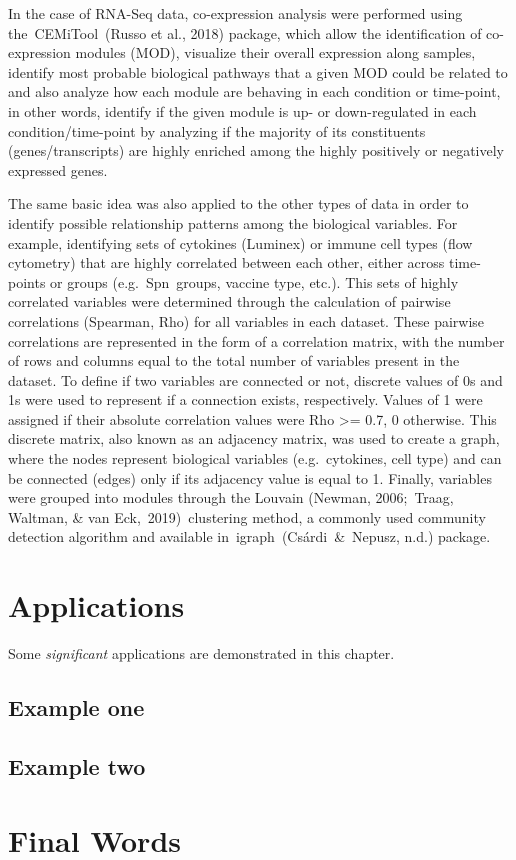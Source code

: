 \documentclass[
]{book}
\begin{document}
In the case of RNA-Seq data, co-expression analysis were performed using the~CEMiTool~(Russo et al., 2018)⁠ package, which allow the identification of co-expression modules (MOD), visualize their overall expression along samples, identify most probable biological pathways that a given MOD could be related to and also analyze how each module are behaving in each condition or time-point, in other words, identify if the given module is up- or down-regulated in each condition/time-point by analyzing if the majority of its constituents (genes/transcripts) are highly enriched among the highly positively or negatively expressed genes.

The same basic idea was also applied to the other types of data in order to identify possible relationship patterns among the biological variables. For example, identifying sets of cytokines (Luminex) or immune cell types (flow cytometry) that are highly correlated between each other, either across time-points or groups (e.g.~Spn~groups, vaccine type, etc.). This sets of highly correlated variables were determined through the calculation of pairwise correlations (Spearman, Rho) for all variables in each dataset. These pairwise correlations are represented in the form of a correlation matrix, with the number of rows and columns equal to the total number of variables present in the dataset. To define if two variables are connected or not, discrete values of 0s and 1s were used to represent if a connection exists, respectively. Values of 1 were assigned if their absolute correlation values were \textbar Rho\textbar{} \textgreater= 0.7, 0 otherwise. This discrete matrix, also known as an adjacency matrix, was used to create a graph, where the nodes represent biological variables (e.g.~cytokines, cell type) and can be connected (edges) only if its adjacency value is equal to 1. Finally, variables were grouped into modules through the Louvain (Newman, 2006;~Traag, Waltman, \& van Eck,~2019)⁠~clustering method, a commonly used community detection algorithm and available in~igraph~(Csárdi~\&~Nepusz, n.d.)⁠ package.

\hypertarget{applications}{%
\chapter{Applications}\label{applications}}

Some \emph{significant} applications are demonstrated in this chapter.

\hypertarget{example-one}{%
\section{Example one}\label{example-one}}

\hypertarget{example-two}{%
\section{Example two}\label{example-two}}

\hypertarget{final-words}{%
\chapter{Final Words}\label{final-words}}

  
\end{document}
